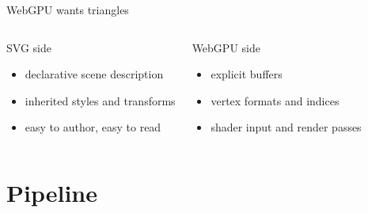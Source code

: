 \documentclass[aspectratio=43]{beamer}
\begin{document}
\begin{frame}{WebGPU wants triangles}
\small
\begin{columns}[T,onlytextwidth]
	\begin{block}{SVG side}
	\begin{itemize}
		\item declarative scene description
		\item inherited styles and transforms
		\item easy to author, easy to read
	\end{itemize}
	\end{block}

	\begin{block}{WebGPU side}
	\begin{itemize}
		\item explicit buffers
		\item vertex formats and indices
		\item shader input and render passes
	\end{itemize}
	\end{block}
\end{columns}

\vspace{0.4em}
\centering
{}
\end{frame}

\section{Pipeline}
\end{document}

